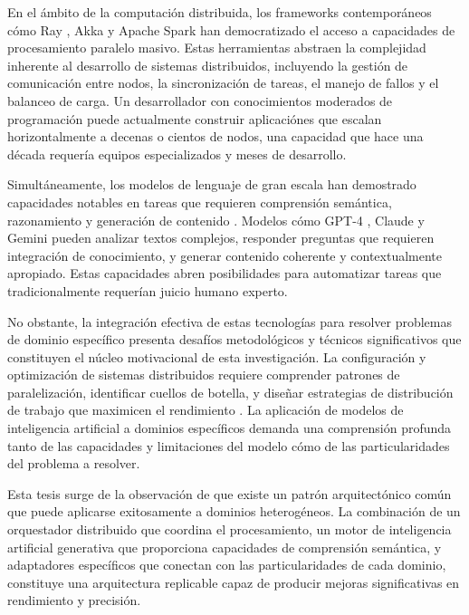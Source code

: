 \documentclass[12pt,a4paper,twoside]{book}
\begin{document}
En el ámbito de la computación distribuida, los frameworks contemporáneos cómo Ray \cite{moritz2018ray}, Akka \cite{akka2022} y Apache Spark \cite{zaharia2016spark} han democratizado el acceso a capacidades de procesamiento paralelo masivo. Estas herramientas abstraen la complejidad inherente al desarrollo de sistemas distribuidos, incluyendo la gestión de comunicación entre nodos, la sincronización de tareas, el manejo de fallos y el balanceo de carga. Un desarrollador con conocimientos moderados de programación puede actualmente construir aplicaciónes que escalan horizontalmente a decenas o cientos de nodos, una capacidad que hace una década requería equipos especializados y meses de desarrollo.

Simultáneamente, los modelos de lenguaje de gran escala han demostrado capacidades notables en tareas que requieren comprensión semántica, razonamiento y generación de contenido \cite{vaswani2017attention, brown2020gpt3}. Modelos cómo GPT-4 \cite{openai2023gpt4}, Claude \cite{anthropic2024claude} y Gemini pueden analizar textos complejos, responder preguntas que requieren integración de conocimiento, y generar contenido coherente y contextualmente apropiado. Estas capacidades abren posibilidades para automatizar tareas que tradicionalmente requerían juicio humano experto.

No obstante, la integración efectiva de estas tecnologías para resolver problemas de dominio específico presenta desafíos metodológicos y técnicos significativos que constituyen el núcleo motivacional de esta investigación. La configuración y optimización de sistemas distribuidos requiere comprender patrones de paralelización, identificar cuellos de botella, y diseñar estrategias de distribución de trabajo que maximicen el rendimiento \cite{amdahl1967, gustafson1967amdahl}. La aplicación de modelos de inteligencia artificial a dominios específicos demanda una comprensión profunda tanto de las capacidades y limitaciones del modelo cómo de las particularidades del problema a resolver.

Esta tesis surge de la observación de que existe un patrón arquitectónico común que puede aplicarse exitosamente a dominios heterogéneos. La combinación de un orquestador distribuido que coordina el procesamiento, un motor de inteligencia artificial generativa que proporciona capacidades de comprensión semántica, y adaptadores específicos que conectan con las particularidades de cada dominio, constituye una arquitectura replicable capaz de producir mejoras significativas en rendimiento y precisión.
\end{document}
